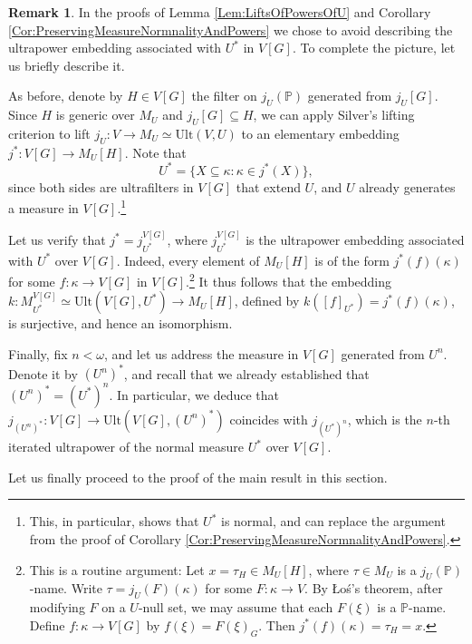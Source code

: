 \documentclass{article}
\theoremstyle{definition}
\newtheorem{remark}[definition]{Remark}
\theoremstyle{plain}
\newcommand{\po}{\mathbb{P}}
\begin{document}
    \begin{remark}
        In the proofs of Lemma \ref{Lem:LiftsOfPowersOfU} and Corollary \ref{Cor:PreservingMeasureNormnalityAndPowers} we chose to avoid describing the ultrapower embedding  associated with $U^*$ in $V[G]$. To complete the picture, let us briefly describe it.
        
        As before, denote by $H\in V[G]$ the filter on $j_U(\po)$ generated from $j_U[G]$. Since $H$ is generic over $M_U$ and $j_U[G]\subseteq H$, we can apply Silver's lifting criterion to lift $j_U\colon V\to M_U\simeq \text{Ult}(V, U)$ to an elementary embedding  $j^*\colon V[G]\to M_U[H]$. Note that 
        $$U^*=\{ X\subseteq \kappa \colon \kappa\in j^*(X)  \},$$ 
        since both sides are ultrafilters in $V[G]$ that extend $U$, and $U$ already generates a measure in $V[G]$.\footnote{This, in particular, shows that $U^*$ is normal, and can replace the argument from the proof of Corollary \ref{Cor:PreservingMeasureNormnalityAndPowers}.} 

        Let us verify that $j^*=j^{V[G]}_{U^*}$, where $j^{V[G]}_{U^*}$ is the ultrapower embedding associated with $U^*$ over $V[G]$. Indeed, every element of $M_U[H]$ is of the form $j^*(f)(\kappa)$ for some $f\colon\kappa\to V[G]$ in $V[G]$.\footnote{This is a routine argument: Let $x=\tau_H\in M_U[H]$, where $\tau\in M_U$ is a $j_U(\po)$-name. Write $\tau=j_U(F)(\kappa)$ for some $F\colon\kappa\to V$. By \L o\'s's theorem, after modifying $F$ on a $U$-null set, we may assume that each $F(\xi)$ is a $\po$-name. Define $f\colon\kappa\to V[G]$ by
        $f(\xi)=F(\xi)_G$. Then
         $j^*(f)(\kappa)=\tau_H=x$.} It thus follows that the embedding $k\colon M^{V[G]}_{U^*}\simeq \text{Ult}(V[G],U^*)\to M_U[H]$, defined by $k([f]_{U^*})=j^*(f)(\kappa)$, is surjective, and hence an isomorphism.

        
        
        Finally, fix $n<\omega$, and let us address the measure in $V[G]$ generated from $U^n$. Denote it by $(U^n)^*$, and recall that we already established that $(U^n)^* = (U^*)^n$. In particular, we deduce that $j_{(U^n)^*}\colon V[G]\to \text{Ult}(V[G], (U^n)^*)$ coincides with $j_{(U^*)^n}$, which is the $n$-th iterated ultrapower of the normal measure $U^*$ over $V[G]$. 
    \end{remark}
    
    Let us finally proceed to the proof of the main result in this section.
    
\end{document}
